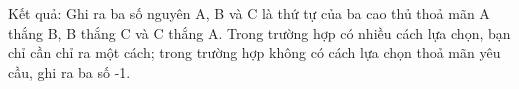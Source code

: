 Kết quả:
Ghi ra ba số nguyên A, B và C là thứ tự của ba cao thủ thoả mãn A thắng B, B thắng C và C thắng A. Trong trường hợp có nhiều cách lựa chọn, bạn chỉ cần chỉ ra một cách; trong trường hợp không có cách lựa chọn thoả mãn yêu cầu, ghi ra ba số -1.